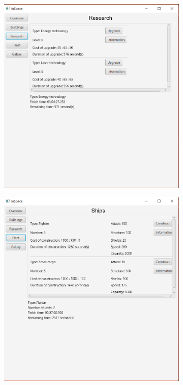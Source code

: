 \begin{figure}[H]
\begin{subfigure}[b]{0.3\textwidth}
\end{subfigure}
\begin{subfigure}[b]{0.3\textwidth} 
\includegraphics[width=1\textwidth]{../screenshots/3.png}
\end{subfigure}
\begin{subfigure}[b]{0.3\textwidth} 
\includegraphics[width=1\textwidth]{../screenshots/4.png}

\end{subfigure}
\end{figure}
